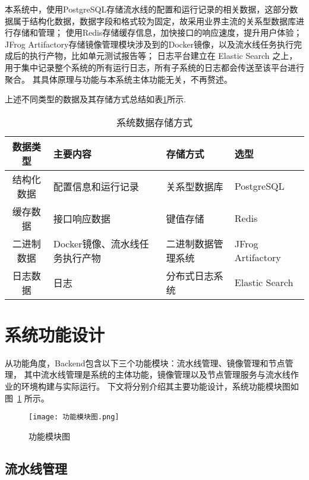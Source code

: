 本系统中，使用PostgreSQL存储流水线的配置和运行记录的相关数据，这部分数据属于结构化数据，数据字段和格式较为固定，故采用业界主流的关系型数据库进行存储和管理；
使用Redis存储缓存信息，加快接口的响应速度，提升用户体验；
JFrog Artifactory存储镜像管理模块涉及到的Docker镜像，以及流水线任务执行完成后的执行产物，比如单元测试报告等；
日志平台建立在 Elastic Search 之上，用于集中记录整个系统的所有运行日志，所有子系统的日志都会传送至该平台进行聚合。
其具体原理与功能与本系统主体功能无关，不再赘述。

上述不同类型的数据及其存储方式总结如表\ref{tab:系统数据存储方式}所示.

\begin{table}[h]
  \centering
  \caption{系统数据存储方式}
  \label{tab:系统数据存储方式}
  \begin{tabular}{clll}
    \toprule
    数据类型 & 主要内容      & 存储方式   & 选型 \\
    \midrule
    结构化数据     & 配置信息和运行记录      & 关系型数据库   & PostgreSQL       \\
    缓存数据       & 接口响应数据                   & 键值存储   & Redis       \\
    二进制数据     & Docker镜像、流水线任务执行产物  & 二进制数据管理系统   & JFrog Artifactory   \\
    日志数据       & 日志                & 分布式日志系统  & Elastic Search       \\
    \bottomrule
  \end{tabular}
\end{table}

\section{系统功能设计}

从功能角度，Backend包含以下三个功能模块：流水线管理、镜像管理和节点管理，
其中流水线管理是系统的主体功能，镜像管理以及节点管理服务与流水线作业的环境构建与实际运行。
下文将分别介绍其主要功能设计，系统功能模块图如图~\ref{fig:功能模块图} 所示。

\begin{figure}[h]
  \centering
  \texttt{[image: 功能模块图.png]}
  \caption{功能模块图}
  \label{fig:功能模块图}
\end{figure}

\subsection{流水线管理}

